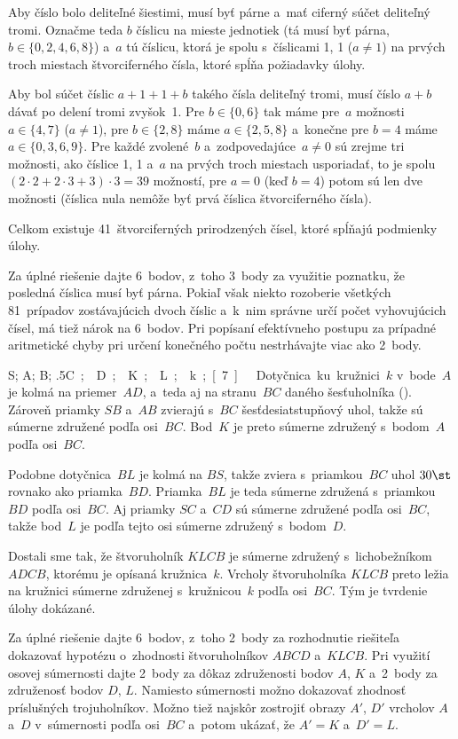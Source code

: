 {%
Aby číslo bolo deliteľné šiestimi, musí byť párne a~mať ciferný
súčet deliteľný tromi. Označme teda $b$ číslicu na mieste
jednotiek (tá musí byť párna, $b\in\{0,2,4,6,8\}$) a~$a$
tú číslicu, ktorá je spolu s~číslicami 1, 1 ($a\ne1$) na prvých troch
miestach štvorciferného čísla, ktoré spĺňa požiadavky úlohy.

Aby bol súčet číslic $a+1+1+b$ takého čísla deliteľný tromi,
musí číslo $a+b$ dávať po delení tromi zvyšok~1. Pre
$b\in\{0,6\}$ tak máme pre~$a$ možnosti $a\in\{4,7\}$ ($a\ne1$),
pre $b\in\{2,8\}$ máme $a\in\{2,5,8\}$ a~konečne pre $b=4$ máme
$a\in\{0,3,6,9\}$. Pre každé zvolené~$b$ a~zodpovedajúce~$a\ne0$
sú zrejme tri možnosti, ako číslice 1, 1 a~$a$ na prvých troch
miestach usporiadať, to je spolu $(2\cdot2+2\cdot3+3)\cdot3=39$
možností, pre $a=0$ (keď $b=4$) potom sú len dve možnosti
(číslica nula nemôže byť prvá číslica štvorciferného čísla).

Celkom existuje 41~štvorciferných prirodzených čísel, ktoré spĺňajú
podmienky úlohy.

\nobreak\medskip\petit\noindent
Za úplné riešenie dajte 6~bodov, z~toho 3~body za využitie poznatku,
že posledná číslica musí byť párna. Pokiaľ však niekto rozoberie
všetkých 81~prípadov zostávajúcich dvoch číslic a~k~nim správne určí
počet vyhovujúcich čísel, má tiež nárok na 6~bodov. Pri popísaní
efektívneho postupu za prípadné aritmetické chyby pri určení
konečného počtu nestrhávajte viac ako 2~body.
\endpetit
\bigbreak
}

{%
\fontplace
\rpoint S; \tpoint A; \lBpoint B; \lpoint\down.5\unit C; \bpoint D;
\tpoint K; \bpoint L; \rBpoint k;
[7] \hfil\Obr 

Dotyčnica ku kružnici~$k$ v~bode~$A$ je kolmá na priemer~$AD$,
a~teda aj na stranu~$BC$ daného šesťuholníka (\obr). Zároveň
priamky $SB$ a~$AB$ zvierajú s~$BC$ šesťdesiatstupňový uhol, takže
sú súmerne združené podľa osi~$BC$. Bod~$K$ je preto
súmerne združený s~bodom~$A$ podľa osi~$BC$.
\inspicture{}

Podobne dotyčnica~$BL$ je kolmá na $BS$, takže zviera s~priamkou~$BC$
uhol $30\st$ rovnako ako priamka~$BD$. Priamka~$BL$ je teda
súmerne združená s~priamkou~$BD$ podľa osi~$BC$. Aj priamky
$SC$ a~$CD$ sú súmerne združené podľa osi~$BC$, takže bod~$L$
je podľa tejto osi súmerne združený s~bodom~$D$.

Dostali sme tak, že štvoruholník $KLCB$ je súmerne združený
s~lichobežníkom $ADCB$, ktorému je opísaná kružnica~$k$. Vrcholy
štvoruholníka $KLCB$ preto ležia na kružnici súmerne združenej
s~kružnicou~$k$ podľa osi~$BC$. Tým je tvrdenie úlohy dokázané.


\nobreak\medskip\petit\noindent
Za úplné riešenie dajte 6~bodov, z~toho 2~body za rozhodnutie
riešiteľa dokazovať hypotézu o~zhodnosti štvoruholníkov $ABCD$
a~$KLCB$. Pri využití osovej súmernosti dajte 2~body za dôkaz
združenosti bodov $A$, $K$ a~2~body za združenosť bodov $D$, $L$.
Namiesto súmernosti možno dokazovať zhodnosť príslušných trojuholníkov.
Možno tiež najskôr zostrojiť obrazy $A'$, $D'$ vrcholov $A$
a~$D$ v~súmernosti podľa osi~$BC$ a~potom ukázať, že $A'=K$ 
a~$D'=L$.
\endpetit
\bigbreak
}

